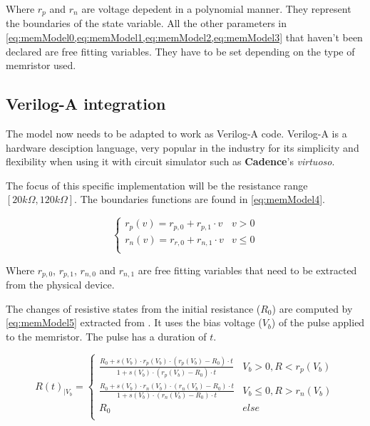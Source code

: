 Where $r_p$ and $r_n$ are voltage depedent in a polynomial manner. They represent the boundaries of the state variable. All the other parameters in \cref{eq:memModel0,eq:memModel1,eq:memModel2,eq:memModel3} that haven't been declared are free fitting variables. They have to be set depending on the type of memristor used.

\subsection{Verilog-A integration}

The model now needs to be adapted to work as Verilog-A code.
Verilog-A is a hardware desciption language, very popular in the industry for its simplicity and flexibility when using it with circuit simulator such as \textbf{Cadence}'s \textit{virtuoso}.

The focus of this specific implementation will be the resistance range $[20k\Omega, 120k\Omega]$. The boundaries functions are found in \cref{eq:memModel4}.

\begin{equation}\label{eq:memModel4}
  \begin{cases}
    r_p(v)= r_{p,0} + r_{p,1}\cdot v& v>0\\
    r_n(v)= r_{r,0} + r_{n,1}\cdot v& v\le 0\\
  \end{cases}
\end{equation}

Where $r_{p,0}$, $r_{p,1}$, $r_{n,0}$ and $r_{n,1}$ are free fitting variables that need to be extracted from the physical device.

The changes of resistive states from the initial resistance ($R_0$) are computed by \cref{eq:memModel5} extracted from \cite{memCadenceModel}. It uses the bias voltage ($V_b$) of the pulse applied to the memristor. The pulse has a duration of $t$.

\begin{equation}\label{eq:memModel5}
  R(t)_{|V_b} =
  \begin{cases}
    \frac{R_0+s(V_b)\cdot r_p(V_b)\cdot(r_p(V_b)-R_0)\cdot t}{1+s(V_b)\cdot (r_p(V_b)-R_0)\cdot t} & V_b>0, R<r_p(V_b)\\
    \frac{R_0+s(V_b)\cdot r_n(V_b)\cdot(r_n(V_b)-R_0)\cdot t}{1+s(V_b)\cdot (r_n(V_b)-R_0)\cdot t} & V_b\le 0, R>r_n(V_b)\\
    R_0 & else\\
  \end{cases}
\end{equation}

